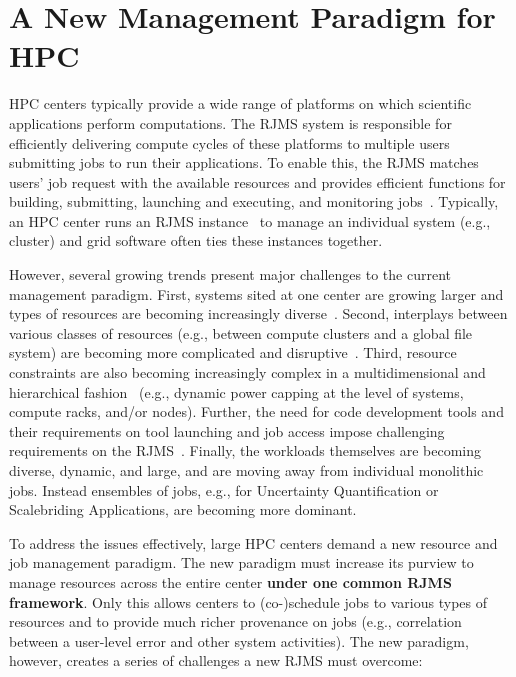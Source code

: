 \section{A New Management Paradigm for HPC}
\label{label:paradigm}
HPC centers typically provide a wide range of 
platforms on which scientific applications perform
computations.
The RJMS system is responsible for efficiently delivering 
compute cycles of these platforms
to multiple users submitting jobs to run their applications. 
To enable this, the RJMS matches users' job request with the available 
resources and provides efficient functions 
for building, submitting, launching and executing, 
and monitoring jobs~\cite{GeorgiouThesis}. 
Typically, an HPC center runs an RJMS instance~\cite{Jette02slurm} 
to manage an individual system (e.g., cluster) and 
grid software often ties these instances together. 

However, several growing trends present major challenges 
to the current management paradigm. 
First, systems sited at one center are growing larger 
and types of resources are becoming increasingly diverse~\cite{GeorgiouThesis}. 
Second, interplays between 
various classes of resources
(e.g., between compute clusters and a global file system)
are becoming more complicated and disruptive~\cite{SCR,SPINDLE}. 
Third, resource constraints are also becoming increasingly
complex in a multidimensional and hierarchical fashion~\cite{power-overprovision}
(e.g., dynamic power capping at the level of systems, compute racks, and/or nodes).
Further, the need for code development tools and their requirements on tool launching and job access
impose challenging requirements on the RJMS~\cite{STAT,SPINDLE,PRUNER,SCR,launchmon}.
Finally, the workloads themselves are becoming 
diverse, dynamic, and large, and are moving away from individual monolithic jobs. Instead
ensembles of jobs, e.g., for Uncertainty Quantification 
or Scalebriding Applications, are becoming more dominant.

To address the issues effectively,
large HPC centers demand a new resource and job management paradigm.
The new paradigm must increase its purview
to manage resources across the entire center
{\bf under one common RJMS framework}. Only this allows
centers to (co-)schedule jobs 
to various types of resources and to
provide much richer provenance on jobs (e.g., correlation between
a user-level error and other system activities). The new paradigm, however,
creates a series of challenges a new RJMS must overcome:

